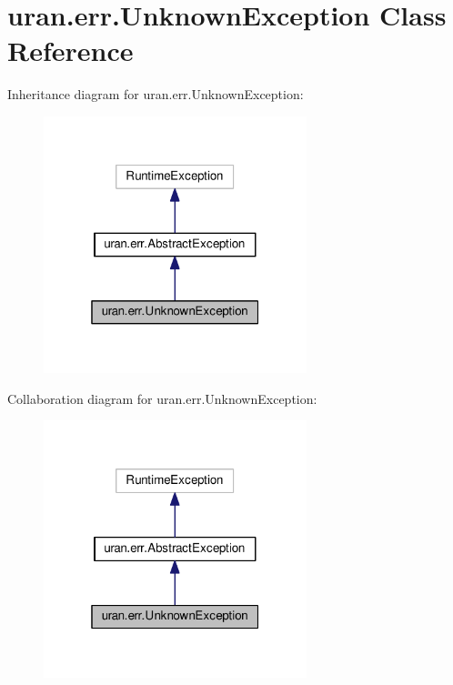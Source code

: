 \hypertarget{classuran_1_1err_1_1_unknown_exception}{}\section{uran.\+err.\+Unknown\+Exception Class Reference}
\label{classuran_1_1err_1_1_unknown_exception}


Inheritance diagram for uran.\+err.\+Unknown\+Exception\+:
\nopagebreak
\begin{figure}[H]
\begin{center}
\leavevmode
\includegraphics[width=217pt]{classuran_1_1err_1_1_unknown_exception__inherit__graph}
\end{center}
\end{figure}


Collaboration diagram for uran.\+err.\+Unknown\+Exception\+:
\nopagebreak
\begin{figure}[H]
\begin{center}
\leavevmode
\includegraphics[width=217pt]{classuran_1_1err_1_1_unknown_exception__coll__graph}
\end{center}
\end{figure}
